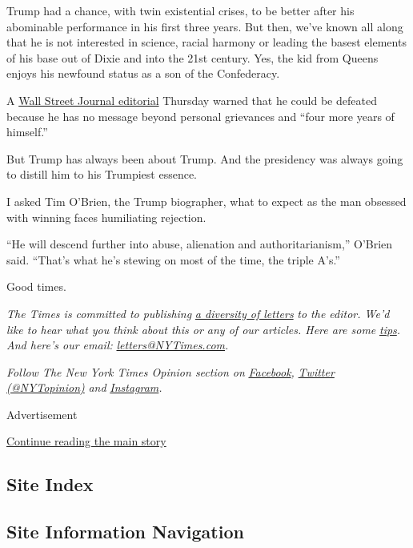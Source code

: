 Trump had a chance, with twin existential crises, to be better after his
abominable performance in his first three years. But then, we've known
all along that he is not interested in science, racial harmony or
leading the basest elements of his base out of Dixie and into the 21st
century. Yes, the kid from Queens enjoys his newfound status as a son of
the Confederacy.

A
\href{https://www.wsj.com/articles/the-trump-referendum-11593127700?mod=opinion_lead_pos10}{Wall
Street Journal editorial} Thursday warned that he could be defeated
because he has no message beyond personal grievances and ``four more
years of himself.''

But Trump has always been about Trump. And the presidency was always
going to distill him to his Trumpiest essence.

I asked Tim O'Brien, the Trump biographer, what to expect as the man
obsessed with winning faces humiliating rejection.

``He will descend further into abuse, alienation and authoritarianism,''
O'Brien said. ``That's what he's stewing on most of the time, the triple
A's.''

Good times.

\emph{The Times is committed to publishing}
\href{https://www.nytimes3xbfgragh.onion/2019/01/31/opinion/letters/letters-to-editor-new-york-times-women.html}{\emph{a
diversity of letters}} \emph{to the editor. We'd like to hear what you
think about this or any of our articles. Here are some}
\href{https://help.nytimes3xbfgragh.onion/hc/en-us/articles/115014925288-How-to-submit-a-letter-to-the-editor}{\emph{tips}}\emph{.
And here's our email:}
\href{mailto:letters@NYTimes.com}{\emph{letters@NYTimes.com}}\emph{.}

\emph{Follow The New York Times Opinion section on}
\href{https://www.facebookcorewwwi.onion/nytopinion}{\emph{Facebook}}\emph{,}
\href{http://twitter.com/NYTOpinion}{\emph{Twitter (@NYTopinion)}}
\emph{and}
\href{https://www.instagram.com/nytopinion/}{\emph{Instagram}}\emph{.}

Advertisement

\protect\hyperlink{after-bottom}{Continue reading the main story}

\hypertarget{site-index}{%
\subsection{Site Index}\label{site-index}}

\hypertarget{site-information-navigation}{%
\subsection{Site Information
Navigation}\label{site-information-navigation}}

